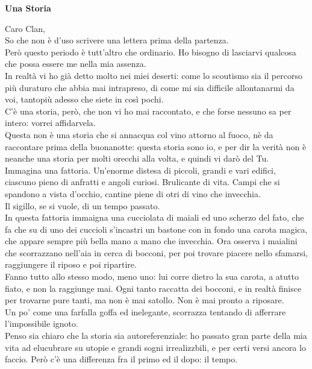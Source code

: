 \documentclass[17pt]{extletter}
\begin{document}
\hspace{4in}
\begin{center}
{\huge\bfseries
Una Storia}
\end{center}

Caro Clan,\\
So che non è d'uso scrivere una lettera prima della partenza.\\
Però questo periodo è tutt'altro che ordinario. Ho bisogno di lasciarvi qualcosa che possa essere me nella mia assenza.\\
In realtà vi ho già detto molto nei miei deserti: come lo scoutismo sia il percorso più duraturo che abbia mai intrapreso, di come mi sia difficile allontanarmi da voi, tantopiù adesso che siete in così pochi.\\
C'è una storia, però, che non vi ho mai raccontato, e che forse nessuno sa per intero: vorrei affidarvela.\\
Questa non è una storia che si annacqua col vino attorno al fuoco, nè da raccontare prima della buonanotte: questa storia sono io, e per dir la verità non è neanche una storia per molti orecchi alla volta, e quindi vi darò del Tu.\\
Immagina una fattoria. Un'enorme distesa di piccoli, grandi e vari edifici, ciascuno pieno di anfratti e angoli curiosi. Brulicante di vita. Campi che si spandono a vista d'occhio, cantine piene di otri di vino che invecchia.\\
Il sigillo, se si vuole, di un tempo passato.\\
In questa fattoria immaigna una cucciolata di maiali ed uno scherzo del fato, che fa che su di uno dei cuccioli s'incastri un bastone con in fondo una carota magica, che appare sempre più bella mano a mano che invecchia. Ora osserva i maialini che scorrazzano nell'aia in cerca di bocconi, per poi trovare piacere nello sfamarsi, raggiungere il riposo e poi ripartire.\\
Fanno tutto allo stesso modo, meno uno: lui corre dietro la sua carota, a atutto fiato, e non la raggiunge mai. Ogni tanto raccatta dei bocconi, e in realtà finisce per trovarne pure tanti, ma non è mai satollo. Non è mai pronto a riposare.\\
Un po' come una farfalla goffa ed inelegante, scorrazza tentando di afferrare l'impossibile ignoto.\\
Penso sia chiaro che la storia sia autoreferenziale: ho passato gran parte della mia vita ad elucubrare su utopie e grandi sogni irrealizzbili, e per certi versi ancora lo faccio. Però c'è una differenza fra il primo ed il dopo: il tempo.\\
\end{document}
